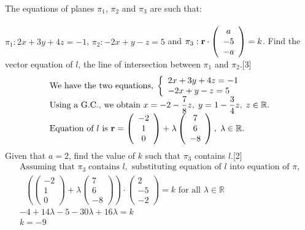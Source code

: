 \documentclass[12pt, a4 paper]{article}
\begin{document}
\begin{outline}[enumerate]
					\color{black}
					\1 The equations of planes ${\pi _1}$, ${\pi _2}$ and ${\pi _3}$ are such that: \\\\
					${\pi _1}:2x + 3y + 4z =  - 1$, \;\;  ${\pi _2}: - 2x + y - z = 5$ \;\;  and\;\;   ${\pi _3}:{\bf{r}} \cdot \left( {\begin{array}{*{20}{c}}a\\{ - 5}\\{ - a}\end{array}} \right) = k$.
					\2 Find the vector equation of $l$, the line of intersection between ${\pi _1}$ and ${\pi _2}$.\hfill[3]
					\color{blue}
					\[\begin{array}{l}{\textrm{We have the two equations,}}\;\left\{ \begin{array}{l}2x + 3y + 4z =  - 1\\ - 2x + y - z = 5\end{array} \right.\\{\textrm{Using a G}}{\textrm{.C}}{\textrm{., we obtain }}x =  - 2 - \dfrac{7}{8}z,\;y = 1 - \dfrac{3}{4}z,\;z \in \mathbb{R}.\\{\textrm{Equation of }}l{\textrm{ is }}{\bf{r}} = \left( {\begin{array}{*{20}{c}}{ - 2}\\1\\0\end{array}} \right) + \lambda \left( {\begin{array}{*{20}{c}}7\\6\\{ - 8}\end{array}} \right),\;\lambda  \in \mathbb{R}.\end{array}\]
					\color{black}
					\2 Given that $a = 2$, find the value of $k$ such that ${\pi _3}$ contains $l$.\hfill[2]
					\color{blue}
					\[\begin{array}{l}{\textrm{Assuming that }}{\pi _3}\;{\textrm{contains }}l,{\textrm{ substituting equation of }}l{\textrm{ into equation of }}\pi {\textrm{,}}\\{\textrm{ }}\left( {\left( {\begin{array}{*{20}{c}}{ - 2}\\1\\0\end{array}} \right) + \lambda \left( {\begin{array}{*{20}{c}}7\\6\\{ - 8}\end{array}} \right)} \right) \cdot \left( {\begin{array}{*{20}{c}}2\\{ - 5}\\{ - 2}\end{array}} \right) = k{\textrm{ for all }}\lambda  \in \mathbb{R}\\ - 4 + 14\lambda  - 5 - 30\lambda  + 16\lambda  = k\\k =  - 9\end{array}\]


\end{outline}
\end{document}
